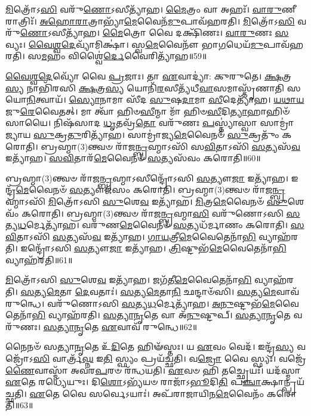 \-\ul{𑌮𑌿}\-𑌤𑍍𑌰𑍋᳴𑌽\-\ul{𑌸𑌿} 𑌵𑌰𑍁᳴\-\ul{𑌣𑍋}\-\-𑌽𑌸𑍀𑌤𑍍𑌯𑌾᳴𑌹।
\-\ul{𑌮𑍈}\-𑌤𑍍𑌰𑌂 𑌵𑌾 𑌅𑌹𑌃᳴।
\-\ul{𑌵𑌾}\-\-\ul{𑌰𑍁}\-𑌣𑍀 𑌰𑌾𑌤𑍍𑌰𑌿𑌃᳴।
\-\ul{𑌅}\-\-\ul{𑌹𑍋}\-\-\ul{𑌰𑌾}\-𑌤𑍍𑌰𑌾𑌭𑍍𑌯𑌾᳴\-\ul{𑌮𑍇}\-𑌵𑍈𑌨᳴\-\ul{𑌮𑍁}\-𑌪𑌾𑌵᳴𑌹𑌰𑌤𑌿।
\-\ul{𑌮𑌿}\-𑌤𑍍𑌰𑍋᳴𑌽\-\ul{𑌸𑌿} 𑌵𑌰𑍁᳴\-\ul{𑌣𑍋}\-\-𑌽𑌸𑍀𑌤𑍍𑌯𑌾᳴𑌹।
\-\ul{𑌮𑍈}\-𑌤𑍍𑌰𑍋 𑌵𑍈 𑌦𑌕𑍍𑌷𑌿᳴𑌣𑌃।
\-\ul{𑌵𑌾}\-\-\ul{𑌰𑍁}\-𑌣𑌃 \ul{𑌸}\-𑌵𑍍𑌯𑌃।
\-\ul{𑌵𑍈}\-\-\ul{𑌶𑍍𑌵}\-\-\ul{𑌦𑍇}\-𑌵𑍍𑌯𑌾᳴𑌮𑌿𑌕𑍍𑌷𑌾॑।
𑌸𑍍𑌵\-\ul{𑌮𑍇}\-𑌵𑍈𑌨𑍗᳴ 𑌭𑌾\-\ul{𑌗}\-𑌧𑍇𑌯᳴\-\ul{𑌮𑍁}\-𑌪𑌾𑌵᳴𑌹𑌰𑌤𑌿।
𑌸\-\ul{𑌮}\-𑌹𑌂 𑌵𑌿𑌶𑍍𑌵𑍈॑\-\ul{𑌰𑍍𑌦𑍇}\-𑌵𑍈𑌰𑌿𑌤𑍍𑌯𑌾᳴𑌹॥59॥

\-\ul{𑌵𑍈}\-\-\ul{𑌶𑍍𑌵}\-\-\ul{𑌦𑍇}\-𑌵𑍍𑌯𑍋᳴ 𑌵𑍈 \ul{𑌪𑍍𑌰}\-𑌜𑌾𑌃।
𑌤𑌾 \ul{𑌏}\-𑌵𑌾𑌦𑍍𑌯𑌾॑: 𑌕𑍁𑌰𑍁𑌤𑍇।
\-\ul{𑌕𑍍𑌷}\-𑌤𑍍𑌰\-\ul{𑌸𑍍𑌯} 𑌨𑌾𑌭𑌿᳴𑌰𑌸𑌿 \ul{𑌕𑍍𑌷}\-𑌤𑍍𑌰\-\ul{𑌸𑍍𑌯} 𑌯𑍋𑌨𑌿᳴\-\ul{𑌰}\-𑌸𑍀𑌤𑍍𑌯᳴𑌧𑍀\-\ul{𑌵𑌾}\-𑌸𑌮𑌾𑌸𑍍𑌤𑍃᳴𑌣𑌾𑌤𑌿 𑌸𑌯𑍋\-\ul{𑌨𑌿}\-𑌤𑍍𑌵𑌾𑌯᳴।
\-\ul{𑌸𑍍𑌯𑍋}\-𑌨𑌾𑌮𑌾 𑌸𑍀᳴𑌦 \ul{𑌸𑍁}\-𑌷\-\ul{𑌦𑌾}\-𑌮𑌾 \ul{𑌸𑍀}\-𑌦𑍇𑌤𑍍𑌯𑌾᳴𑌹।
\-\ul{𑌯}\-\-\ul{𑌥𑌾}\-\-\ul{𑌯}\-𑌜𑍁\-\ul{𑌰𑍇}\-𑌵𑍈𑌤𑌤𑍍।
𑌮𑌾 𑌤𑍍𑌵𑌾᳴ 𑌹𑌿𑍞\-\ul{𑌸𑍀}\-𑌨𑍍𑌮𑌾 𑌮𑌾᳴ 𑌹𑌿𑍞\-\ul{𑌸𑍀}\-𑌦𑌿\-\ul{𑌤𑍍𑌯𑌾}\-𑌹𑌾𑌹𑌿𑍞᳴𑌸𑌾𑌯𑍈।
𑌨𑌿𑌷᳴𑌸𑌾𑌦 \ul{𑌧𑍃}\-𑌤𑌵𑍍𑌰᳴\-\ul{𑌤𑍋} 𑌵𑌰𑍁᳴𑌣𑌃 \ul{𑌪}\-𑌸𑍍𑌤𑍍𑌯𑌾॑𑌸𑍍𑌵𑌾 𑌸𑌾𑌮𑍍𑌰𑌾॑𑌜𑍍𑌯𑌾𑌯 \ul{𑌸𑍁}\-𑌕𑍍𑌰\-\ul{𑌤𑍁}\-𑌰𑌿𑌤𑍍𑌯𑌾᳴𑌹।
𑌸𑌾𑌮𑍍𑌰𑌾॑𑌜𑍍𑌯\-\ul{𑌮𑍇}\-𑌵𑍈𑌨𑍞᳴ \ul{𑌸𑍁}\-𑌕𑍍𑌰𑌤𑍁𑌂᳴ 𑌕𑌰𑍋𑌤𑌿।
𑌬𑍍𑌰𑌹𑍍𑌮𑌾(3)𑌨𑍍𑌤𑍍𑌵𑍞 𑌰𑌾᳴𑌜\-\ul{𑌨𑍍𑌬𑍍𑌰}\-𑌹𑍍𑌮𑌾𑌽𑌸𑌿᳴ 𑌸\-\ul{𑌵𑌿}\-𑌤𑌾𑌽𑌸𑌿᳴ \ul{𑌸}\-𑌤𑍍𑌯𑌸᳴\-\ul{𑌵} 𑌇𑌤𑍍𑌯𑌾᳴𑌹।
\-\ul{𑌸}\-\-\ul{𑌵𑌿}\-𑌤𑌾𑌰᳴\-\ul{𑌮𑍇}\-𑌵𑍈𑌨𑍞᳴ \ul{𑌸}\-𑌤𑍍𑌯𑌸᳴𑌵𑌂 𑌕𑌰𑍋𑌤𑌿॥60॥

𑌬𑍍𑌰𑌹𑍍𑌮𑌾(3)𑌨𑍍𑌤𑍍𑌵𑍞 𑌰𑌾᳴𑌜\-\ul{𑌨𑍍𑌬𑍍𑌰}\-𑌹𑍍𑌮𑌾\-𑌽𑌸𑍀𑌨𑍍𑌦𑍍𑌰𑍋᳴𑌽𑌸𑌿 \ul{𑌸}\-𑌤𑍍𑌯𑍗\-\ul{𑌜𑌾} 𑌇𑌤𑍍𑌯𑌾᳴𑌹।
𑌇𑌨𑍍𑌦𑍍𑌰᳴\-\ul{𑌮𑍇}\-𑌵𑍈𑌨𑍞᳴ \ul{𑌸}\-𑌤𑍍𑌯𑍗𑌜᳴𑌸𑌂 𑌕𑌰𑍋𑌤𑌿।
𑌬𑍍𑌰𑌹𑍍𑌮𑌾(3)𑌨𑍍𑌤𑍍𑌵𑍞 𑌰𑌾᳴𑌜\-\ul{𑌨𑍍𑌬𑍍𑌰}\-𑌹𑍍𑌮𑌾𑌽𑌸𑌿᳴ \ul{𑌮𑌿}\-𑌤𑍍𑌰𑍋᳴𑌽𑌸𑌿 \ul{𑌸𑍁}\-𑌶𑍇\-\ul{𑌵} 𑌇𑌤𑍍𑌯𑌾᳴𑌹।
\-\ul{𑌮𑌿}\-𑌤𑍍𑌰\-\ul{𑌮𑍇}\-𑌵𑍈𑌨𑍞᳴ \ul{𑌸𑍁}\-𑌶𑍇𑌵𑌂᳴ 𑌕𑌰𑍋𑌤𑌿।
𑌬𑍍𑌰𑌹𑍍𑌮𑌾(3)𑌨𑍍𑌤𑍍𑌵𑍞 𑌰𑌾᳴𑌜\-\ul{𑌨𑍍𑌬𑍍𑌰}\-𑌹𑍍𑌮𑌾\-\ul{𑌸𑌿} 𑌵𑌰𑍁᳴𑌣𑍋𑌽𑌸𑌿 \ul{𑌸}\-𑌤𑍍𑌯\-\ul{𑌧}\-𑌰𑍍𑌮𑍇𑌤𑍍𑌯𑌾᳴𑌹।
𑌵𑌰𑍁᳴𑌣\-\ul{𑌮𑍇}\-𑌵𑍈𑌨𑍞᳴ \ul{𑌸}\-𑌤𑍍𑌯𑌧᳴𑌰𑍍𑌮𑌾𑌣𑌂 𑌕𑌰𑍋𑌤𑌿।
\-\ul{𑌸}\-\-\ul{𑌵𑌿}\-𑌤𑌾𑌽𑌸𑌿᳴ \ul{𑌸}\-𑌤𑍍𑌯𑌸᳴\-\ul{𑌵} 𑌇𑌤𑍍𑌯𑌾᳴𑌹।
\-\ul{𑌗𑌾}\-\-\ul{𑌯}\-𑌤𑍍𑌰𑍀\-\ul{𑌮𑍇}\-𑌵𑍈𑌤𑍇𑌨𑌾᳴\-\ul{𑌭𑌿} 𑌵𑍍𑌯𑌾𑌹᳴𑌰𑌤𑌿।
𑌇𑌨𑍍𑌦𑍍𑌰𑍋᳴𑌽𑌸𑌿 \ul{𑌸}\-𑌤𑍍𑌯𑍗\-\ul{𑌜𑌾} 𑌇𑌤𑍍𑌯𑌾᳴𑌹।
\-\ul{𑌤𑍍𑌰𑌿}\-𑌷𑍍𑌟𑍁𑌭᳴\-\ul{𑌮𑍇}\-𑌵𑍈𑌤𑍇𑌨𑌾᳴\-\ul{𑌭𑌿} 𑌵𑍍𑌯𑌾𑌹᳴𑌰𑌤𑌿॥61॥

\-\ul{𑌮𑌿}\-𑌤𑍍𑌰𑍋᳴𑌽𑌸𑌿 \ul{𑌸𑍁}\-𑌶𑍇\-\ul{𑌵} 𑌇𑌤𑍍𑌯𑌾᳴𑌹।
𑌜𑌗᳴𑌤𑍀\-\ul{𑌮𑍇}\-𑌵𑍈𑌤𑍇𑌨𑌾᳴\-\ul{𑌭𑌿} 𑌵𑍍𑌯𑌾𑌹᳴𑌰𑌤𑌿।
\-\ul{𑌸}\-𑌤𑍍𑌯\-\ul{𑌮𑍇}\-𑌤𑌾 \ul{𑌦𑍇}\-𑌵𑌤𑌾𑌃॑।
\-\ul{𑌸}\-𑌤𑍍𑌯\-\ul{𑌮𑍇}\-𑌤𑌾\-\ul{𑌨𑌿} 𑌛𑌨𑍍𑌦𑌾𑍞᳴𑌸𑌿।
\-\ul{𑌸}\-𑌤𑍍𑌯\-\ul{𑌮𑍇}\-𑌵𑌾𑌵᳴ 𑌰𑍁𑌨𑍍𑌧𑍇।
𑌵𑌰𑍁᳴𑌣𑍋𑌽𑌸𑌿 \ul{𑌸}\-𑌤𑍍𑌯\-\ul{𑌧}\-𑌰𑍍𑌮𑍇𑌤𑍍𑌯𑌾᳴𑌹।
\-\ul{𑌅}\-\-\ul{𑌨𑍁}\-𑌷𑍍𑌟𑍁𑌭᳴\-\ul{𑌮𑍇}\-𑌵𑍈𑌤𑍇𑌨𑌾᳴\-\ul{𑌭𑌿} 𑌵𑍍𑌯𑌾𑌹᳴𑌰𑌤𑌿।
\-\ul{𑌸}\-\-\ul{𑌤𑍍𑌯𑌾}\-\-\ul{𑌨𑍃}\-𑌤𑍇 𑌵𑌾 𑌅᳴\-\ul{𑌨𑍁}\-𑌷𑍍𑌟𑍁𑌪𑍍।
\-\ul{𑌸}\-\-\ul{𑌤𑍍𑌯𑌾}\-\-\ul{𑌨𑍃}\-𑌤𑍇 𑌵𑌰𑍁᳴𑌣𑌃।
\-\ul{𑌸}\-\-\ul{𑌤𑍍𑌯𑌾}\-\-\ul{𑌨𑍃}\-𑌤𑍇 \ul{𑌏}\-𑌵𑌾𑌵᳴ 𑌰𑍁𑌨𑍍𑌧𑍇॥62॥

𑌨𑍈𑌨𑍞᳴ 𑌸𑌤𑍍𑌯𑌾\-\ul{𑌨𑍃}\-𑌤𑍇 𑌉᳴\-\ul{𑌦𑌿}\-𑌤𑍇 𑌹𑌿𑍟᳴𑌸𑍍𑌤𑌃।
𑌯 \ul{𑌏}\-𑌵𑌂 𑌵𑍇𑌦᳴।
𑌇𑌨𑍍𑌦𑍍𑌰᳴\-\ul{𑌸𑍍𑌯} 𑌵𑌜𑍍𑌰𑍋᳴𑌽\-\ul{𑌸𑌿} 𑌵𑌾𑌰𑍍𑌤𑍍𑌰᳴\-\ul{𑌘𑍍𑌨} 𑌇\-\ul{𑌤𑌿} 𑌸𑍍𑌫𑍍𑌯𑌂 𑌪𑍍𑌰𑌯᳴𑌚𑍍𑌛𑌤𑌿।
𑌵\-\ul{𑌜𑍍𑌰𑍋} 𑌵𑍈 𑌸𑍍𑌫𑍍𑌯𑌃।
𑌵𑌜𑍍𑌰𑍇᳴\-\ul{𑌣𑍈}\-𑌵𑌾𑌸𑍍𑌮𑌾᳴ 𑌅𑌵𑌰\-\ul{𑌪}\-𑌰𑍞 𑌰᳴𑌨𑍍𑌧𑌯𑌤𑌿।
\-\ul{𑌏}\-𑌵𑍞 𑌹𑌿 𑌤𑌚𑍍𑌛𑍍𑌰𑍇𑌯𑌃᳴।
𑌯𑌦᳴𑌸𑍍𑌮𑌾 \ul{𑌏}\-𑌤𑍇 𑌰𑌧𑍍𑌯𑍇᳴𑌯𑍁𑌃।
𑌦𑌿\-\ul{𑌶𑍋}\-\-𑌽𑌭𑍍𑌯᳴𑌯𑍞 𑌰𑌾𑌜𑌾᳴\-𑌽\-\ul{𑌭𑍂}\-𑌦𑌿\-\ul{𑌤𑌿} 𑌪\-\ul{𑌞𑍍𑌚𑌾}\-𑌕𑍍𑌷𑌾𑌨𑍍𑌪𑍍𑌰𑌯᳴𑌚𑍍𑌛𑌤𑌿।
\-\ul{𑌏}\-𑌤𑍇 𑌵𑍈 𑌸𑌰𑍍𑌵𑍇\-𑌽𑌯𑌾𑌃॑।
𑌅𑌪᳴𑌰𑌾𑌜𑌾𑌯𑌿𑌨\-\ul{𑌮𑍇}\-𑌵𑍈𑌨𑌂᳴ 𑌕𑌰𑍋𑌤𑌿॥63॥

